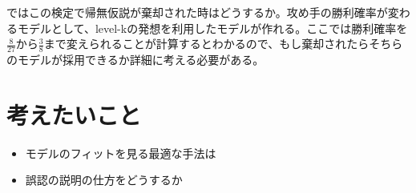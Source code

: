 \documentclass{jsarticle}
\begin{document}
ではこの検定で帰無仮説が棄却された時はどうするか。攻め手の勝利確率が変わるモデルとして、level-kの発想を利用したモデルが作れる。ここでは勝利確率を$\frac{8}{27}$から$\frac{3}{8}$まで変えられることが計算するとわかるので、もし棄却されたらそちらのモデルが採用できるか詳細に考える必要がある。

\section{考えたいこと}
\begin{itemize}
	\item モデルのフィットを見る最適な手法は
	\item 誤認の説明の仕方をどうするか
\end{itemize}
\end{document}
